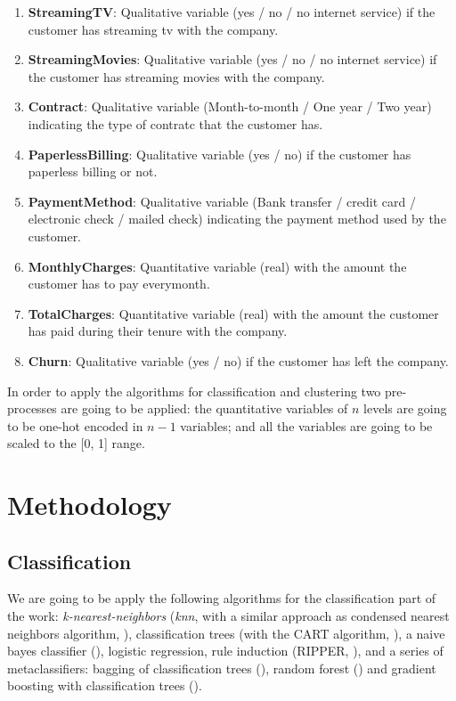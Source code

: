 \documentclass[a4paper,11pt]{article}
\begin{document}
\begin{enumerate}
	\item \textbf{StreamingTV}: Qualitative variable (yes / no / no internet service) if the customer has streaming tv with the company.
	\item \textbf{StreamingMovies}: Qualitative variable (yes / no / no internet service) if the customer has streaming movies with the company.
	\item \textbf{Contract}: Qualitative variable (Month-to-month / One year / Two year) indicating the type of contratc that the customer has.
	\item \textbf{PaperlessBilling}: Qualitative variable (yes / no) if the customer has paperless billing or not.
	\item \textbf{PaymentMethod}: Qualitative variable (Bank transfer / credit card / electronic check / mailed check) indicating the payment method used by the customer.
	\item \textbf{MonthlyCharges}: Quantitative variable (real) with the amount the customer has to pay everymonth.
	\item \textbf{TotalCharges}: Quantitative variable (real) with the amount the customer has paid during their tenure with the company.
	\item \textbf{Churn}: Qualitative variable (yes / no) if the customer has left the company.
\end{enumerate}

In order to apply the algorithms for classification and clustering two pre-processes are going to be applied: the quantitative variables of $n$ levels are going to be one-hot encoded in $n-1$ variables; and all the variables are going to be scaled to the [0, 1] range.

\section{Methodology}

\subsection{Classification}

We are going to be apply the following algorithms for the classification part of the work: \textit{k-nearest-neighbors} (\textit{knn}, with a similar approach as condensed nearest neighbors algorithm, \cite{hart1968}), classification trees (with the CART algorithm, \cite{breiman1984}), a naive bayes classifier (\cite{minsky1961}), logistic regression, rule induction (RIPPER, \cite{cohen1995}), and a series of metaclassifiers: bagging of classification trees (\cite{breiman1996}), random forest (\cite{breiman2001}) and gradient boosting with classification trees (\cite{freund1997}).
\end{document}
